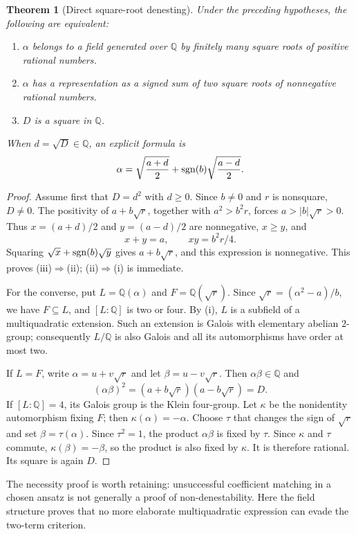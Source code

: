 \documentclass[11pt,a4paper]{article}
\numberwithin{equation}{section}
\newtheorem{theorem}{Theorem}[section]
\theoremstyle{definition}\newtheorem{definition}[theorem]{Definition}
\theoremstyle{remark}\newtheorem{remark}[theorem]{Remark}
\newcommand{\Q}{\mathbb Q}\newcommand{\R}{\mathbb R}\newcommand{\C}{\mathbb C}\newcommand{\Z}{\mathbb Z}
\begin{document}
\begin{theorem}[Direct square-root denesting]\label{thm:direct}
Under the preceding hypotheses, the following are equivalent:
\begin{enumerate}[label=(\roman*),itemsep=1pt]
\item $\alpha$ belongs to a field generated over $\Q$ by finitely many square roots of positive rational numbers.
\item $\alpha$ has a representation as a signed sum of two square roots of nonnegative rational numbers.
\item $D$ is a square in $\Q$.
\end{enumerate}
When $d=\sqrt D\in\Q$, an explicit formula is
\begin{equation}\label{eq:direct}
\alpha=\sqrt{\frac{a+d}{2}}+\operatorname{sgn}(b)\sqrt{\frac{a-d}{2}}.
\end{equation}
\end{theorem}
\begin{proof}
Assume first that $D=d^2$ with $d\ge0$. Since $b\ne0$ and $r$ is nonsquare, $D\ne0$. The positivity of $a+b\sqrt r$, together with $a^2>b^2r$, forces $a>|b|\sqrt r>0$. Thus $x=(a+d)/2$ and $y=(a-d)/2$ are nonnegative, $x\ge y$, and
\[
x+y=a,\qquad xy=b^2r/4.
\]
Squaring $\sqrt x+\operatorname{sgn}(b)\sqrt y$ gives $a+b\sqrt r$, and this expression is nonnegative. This proves (iii)$\Rightarrow$(ii); (ii)$\Rightarrow$(i) is immediate.

For the converse, put $L=\Q(\alpha)$ and $F=\Q(\sqrt r)$. Since $\sqrt r=(\alpha^2-a)/b$, we have $F\subseteq L$, and $[L:\Q]$ is two or four. By (i), $L$ is a subfield of a multiquadratic extension. Such an extension is Galois with elementary abelian $2$-group; consequently $L/\Q$ is also Galois and all its automorphisms have order at most two.

If $L=F$, write $\alpha=u+v\sqrt r$ and let $\beta=u-v\sqrt r$. Then $\alpha\beta\in\Q$ and
\[
(\alpha\beta)^2=(a+b\sqrt r)(a-b\sqrt r)=D.
\]
If $[L:\Q]=4$, its Galois group is the Klein four-group. Let $\kappa$ be the nonidentity automorphism fixing $F$; then $\kappa(\alpha)=-\alpha$. Choose $\tau$ that changes the sign of $\sqrt r$ and set $\beta=\tau(\alpha)$. Since $\tau^2=1$, the product $\alpha\beta$ is fixed by $\tau$. Since $\kappa$ and $\tau$ commute, $\kappa(\beta)=-\beta$, so the product is also fixed by $\kappa$. It is therefore rational. Its square is again $D$.
\end{proof}

The necessity proof is worth retaining: unsuccessful coefficient matching in a chosen ansatz is not generally a proof of non-denestability. Here the field structure proves that no more elaborate multiquadratic expression can evade the two-term criterion.
\end{document}

